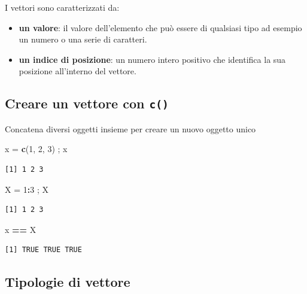 \documentclass[
  a4paper,
  DIV=11,
  numbers=noendperiod]{scrreprt}
\newenvironment{Shaded}{\begin{snugshade}}{\end{snugshade}}
\newcommand{\DecValTok}[1]{\textcolor[rgb]{0.00,0.00,0.81}{#1}}
\newcommand{\FunctionTok}[1]{\textcolor[rgb]{0.13,0.29,0.53}{\textbf{#1}}}
\newcommand{\NormalTok}[1]{#1}
\newcommand{\OtherTok}[1]{\textcolor[rgb]{0.56,0.35,0.01}{#1}}
\newcommand{\SpecialCharTok}[1]{\textcolor[rgb]{0.81,0.36,0.00}{\textbf{#1}}}
\begin{document}
I vettori sono caratterizzati da:

\begin{itemize}
\item
  \textbf{un valore}: il valore dell'elemento che può essere di
  qualsiasi tipo ad esempio un numero o una serie di caratteri.
\item
  \textbf{un indice di posizione}: un numero intero positivo che
  identifica la sua posizione all'interno del vettore.
\end{itemize}

\subsection{\texorpdfstring{Creare un vettore con
\texttt{c()}}{Creare un vettore con c()}}\label{creare-un-vettore-con-c}

Concatena diversi oggetti insieme per creare un nuovo oggetto unico

\begin{Shaded}
\begin{Highlighting}[]
\NormalTok{x }\OtherTok{=} \FunctionTok{c}\NormalTok{(}\DecValTok{1}\NormalTok{, }\DecValTok{2}\NormalTok{, }\DecValTok{3}\NormalTok{) ; x}
\end{Highlighting}
\end{Shaded}

\begin{verbatim}
[1] 1 2 3
\end{verbatim}

\begin{Shaded}
\begin{Highlighting}[]
\NormalTok{X }\OtherTok{=} \DecValTok{1}\SpecialCharTok{:}\DecValTok{3}\NormalTok{ ; X}
\end{Highlighting}
\end{Shaded}

\begin{verbatim}
[1] 1 2 3
\end{verbatim}

\begin{Shaded}
\begin{Highlighting}[]
\NormalTok{x }\SpecialCharTok{==}\NormalTok{ X }
\end{Highlighting}
\end{Shaded}

\begin{verbatim}
[1] TRUE TRUE TRUE
\end{verbatim}

\subsection{Tipologie di vettore}\label{sec-vec}
\end{document}
